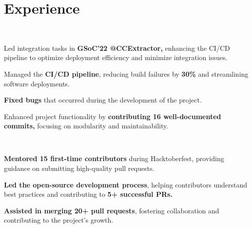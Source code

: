 \documentclass[]{deedy-resume-openfont}
\begin{document}

\section{Experience}
\vspace{0.7mm} 
\hfill {} \\
\vspace{0.7mm} 
\hfill {} 
\vspace{1.7mm}
\begin{tightemize}
	\item Led integration tasks in \textbf{GSoC'22 @CCExtractor,} enhancing the CI/CD pipeline to optimize deployment efficiency and minimize integration issues.
	\vspace{-1mm}
	\item Managed the \textbf{CI/CD pipeline}, reducing build failures by \textbf{30\%} and streamlining software deployments.
	\vspace{-1mm}
	\item \textbf{Fixed bugs} that occurred during the development of the project.
	\vspace{-1mm}
	\item Enhanced project functionality by \textbf{contributing 16 well-documented commits,} focusing on modularity and maintainability.
\end{tightemize}
\sectionsep

\vspace{0.7mm} 
\hfill {} \\
\vspace{0.7mm} 
\hfill {}
\vspace{1.7mm}
\begin{tightemize}
	\item \textbf{Mentored 15 first-time contributors} during Hacktoberfest, providing guidance on submitting high-quality pull requests.
	\vspace{-1mm}
	\item \textbf{Led the open-source development process}, helping contributors understand best practices and contributing to \textbf{5+ successful PRs.}
	\vspace{-1mm}
	\item \textbf{Assisted in merging 20+ pull requests}, fostering collaboration and contributing to the project's growth.
\end{tightemize}
\sectionsep
\end{document}

